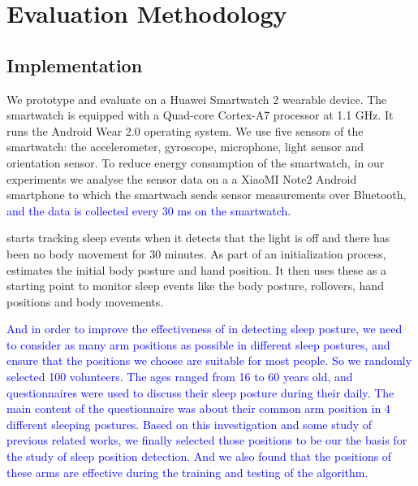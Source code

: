 \section{Evaluation Methodology}
\label{sec:expsetup}

\subsection{Implementation}
We prototype and evaluate \systemname on a Huawei Smartwatch 2 wearable device. The smartwatch is equipped with a Quad-core Cortex-A7
processor at 1.1 GHz.  It runs the Android Wear 2.0 operating system. We use five sensors of the smartwatch: the accelerometer, gyroscope,
microphone, light sensor and orientation sensor. To reduce energy consumption of the smartwatch, in our experiments we analyse the sensor data on a a XiaoMI Note2 Android smartphone to which the smartwach sends sensor measurements over Bluetooth, \textcolor{blue}{and the data is collected every 30 ms on the smartwatch.} %

\systemname starts tracking sleep events when it detects that the light is off and there has been no body movement for 30 minutes. As part of an initialization process, \systemname estimates the initial body posture and hand position. It then uses these as a starting point to monitor sleep events like the body posture, rollovers, hand positions and body movements.

\textcolor{blue}{And in order to improve the effectiveness of {\systemname} in detecting sleep posture, we need to consider as many arm positions as possible in different sleep postures, and ensure that the positions we choose are suitable for most people. So we randomly selected 100 volunteers. The ages ranged from 16 to 60 years old, and questionnaires were used to discuss their sleep posture during their daily. The main content of the questionnaire was about their common arm position in 4 different sleeping postures. Based on this investigation and some study of previous related works\cite{position2014,HandPosition2}, we finally selected those positions to be our the basis for the study of sleep position detection. And we also found that the positions of these arms are effective during the training and testing of the algorithm.}



